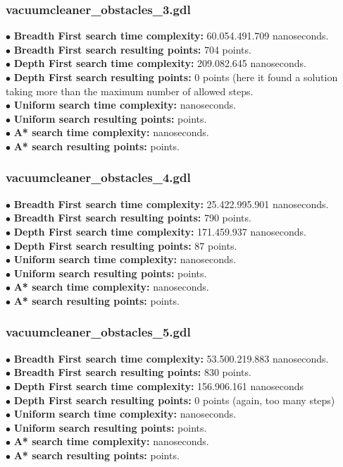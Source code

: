 \documentclass[11pt]{article}
\begin{document}
\subsubsection{vacuumcleaner\_obstacles\_3.gdl}
$\bullet$ {\bf Breadth First search time complexity: } 60.054.491.709 nanoseconds. \\
$\bullet$ {\bf Breadth First search resulting points: } 704 points. \\
$\bullet$ {\bf Depth First search time complexity: } 209.082.645 nanoseconds. \\
$\bullet$ {\bf Depth First search resulting points: } 0 points (here it found a solution taking more than the maximum 
number of allowed steps. \\
$\bullet$ {\bf Uniform search time complexity: } nanoseconds. \\
$\bullet$ {\bf Uniform search resulting points: } points. \\
$\bullet$ {\bf A* search time complexity: } nanoseconds.\\ 
$\bullet$ {\bf A* search resulting points: } points.\\
\subsubsection{vacuumcleaner\_obstacles\_4.gdl}
$\bullet$ {\bf Breadth First search time complexity: } 25.422.995.901 nanoseconds. \\
$\bullet$ {\bf Breadth First search resulting points: } 790 points. \\
$\bullet$ {\bf Depth First search time complexity: } 171.459.937 nanoseconds.\\
$\bullet$ {\bf Depth First search resulting points: } 87 points.\\
$\bullet$ {\bf Uniform search time complexity: } nanoseconds. \\
$\bullet$ {\bf Uniform search resulting points: } points. \\
$\bullet$ {\bf A* search time complexity: } nanoseconds. \\ 
$\bullet$ {\bf A* search resulting points: } points.\\
\subsubsection{vacuumcleaner\_obstacles\_5.gdl}
$\bullet$ {\bf Breadth First search time complexity: } 53.500.219.883 nanoseconds. \\
$\bullet$ {\bf Breadth First search resulting points: } 830 points. \\
$\bullet$ {\bf Depth First search time complexity: } 156.906.161 nanoseconds\\
$\bullet$ {\bf Depth First search resulting points: } 0 points (again, too many steps)\\
$\bullet$ {\bf Uniform search time complexity: } nanoseconds. \\
$\bullet$ {\bf Uniform search resulting points: } points. \\
$\bullet$ {\bf A* search time complexity: } nanoseconds. \\ 
$\bullet$ {\bf A* search resulting points: } points.\\
\end{document}
